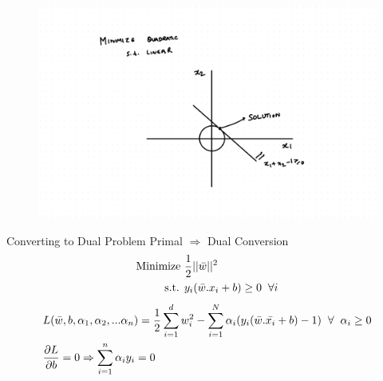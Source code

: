 \documentclass{beamer}
\begin{document}
\begin{frame}

\begin{figure}
\includegraphics[scale=0.5]{SVM/Svm-28.pdf}
\end{figure}


\end{frame}

\begin{frame}{Converting to Dual Problem}
Primal $\Rightarrow$ Dual Conversion\\
\begin{align*}
	\text{Minimize } & \frac{1}{2}||\bar{w}||^{2} \\
	\text{s.t. } & y_{i}(\bar{w}.x_{i} + b) \geq 0 \hspace{2mm}\forall i
	\end{align*}
\begin{align*}
&L(\bar{w},b,\alpha_{1},\alpha_{2},...\alpha_{n}) = \frac{1}{2}
\sum_{i = 1}^{d} w_{i}^{2} - \sum_{i=1}^{N} \alpha_{i}(y_{i}(\bar{w}.\bar{x_{i}} + b) - 1) \hspace{2mm} \forall \hspace{2mm}\alpha_{i} \geq 0\\
&\frac{\partial L}{\partial b} = 0 \Rightarrow \sum_{i=1}^{n}\alpha_{i}y_{i} = 0\\
\end{align*}
\end{frame}
\end{document}
